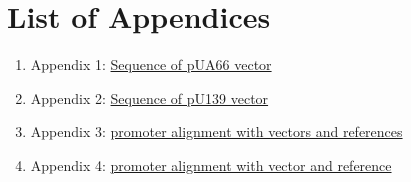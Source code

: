 \chapter*{List of Appendices}

\begin{enumerate}
\item Appendix 1: \hypertarget{pUA66seq}{\href{https://drive.google.com/open?id=1oHOr45i53oj1ZvaJO2rwhhKW336-1qDa}{Sequence of pUA66 vector}}
\item Appendix 2: \hypertarget{p139seq}{\href{https://drive.google.com/open?id=1eTZO0u8nTtbIphnsHlNvB4G_L2-LnJ-f}{Sequence of pU139 vector}}
\item Appendix 3: \hypertarget{placZalign}{\href{https://drive.google.com/open?id=1uxseqbHVccpsxmKUuVl5_nBY2wEvpF8J}{ promoter alignment with vectors and references}}
\item Appendix 4: \hypertarget{precAalign}{\href{https://drive.google.com/open?id=1g5AUZ4vEhNVGWuKy9A7augQ2beI5EW9o}{ promoter alignment with vector and reference}}
\end{enumerate}

%

%

